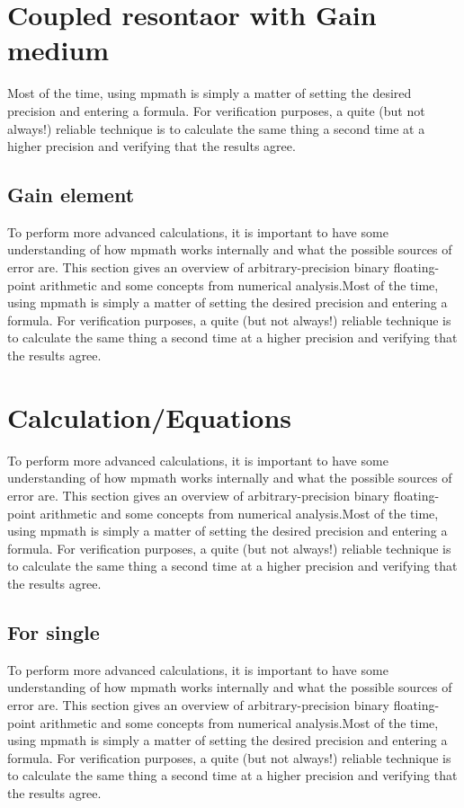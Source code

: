 
\section{Coupled resontaor with Gain medium}
Most of the time, using mpmath is simply a matter of setting the desired precision and entering a formula. For verification purposes, a quite (but not always!) reliable technique is to calculate the same thing a second time at a higher precision and verifying that the results agree.
\subsection{Gain element}
To perform more advanced calculations, it is important to have some understanding of how mpmath works internally and what the possible sources of error are. This section gives an overview of arbitrary-precision binary floating-point arithmetic and some concepts from numerical analysis.Most of the time, using mpmath is simply a matter of setting the desired precision and entering a formula. For verification purposes, a quite (but not always!) reliable technique is to calculate the same thing a second time at a higher precision and verifying that the results agree.

\section{Calculation/Equations}
To perform more advanced calculations, it is important to have some understanding of how mpmath works internally and what the possible sources of error are. This section gives an overview of arbitrary-precision binary floating-point arithmetic and some concepts from numerical analysis.Most of the time, using mpmath is simply a matter of setting the desired precision and entering a formula. For verification purposes, a quite (but not always!) reliable technique is to calculate the same thing a second time at a higher precision and verifying that the results agree.

\subsection{For single}
To perform more advanced calculations, it is important to have some understanding of how mpmath works internally and what the possible sources of error are. This section gives an overview of arbitrary-precision binary floating-point arithmetic and some concepts from numerical analysis.Most of the time, using mpmath is simply a matter of setting the desired precision and entering a formula. For verification purposes, a quite (but not always!) reliable technique is to calculate the same thing a second time at a higher precision and verifying that the results agree.
